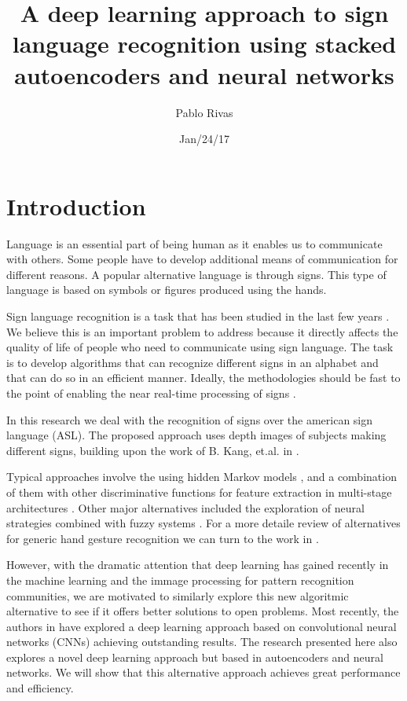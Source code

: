 \title{A deep learning approach to sign language recognition using stacked 
autoencoders and neural networks}
\author{Pablo Rivas}
\date{Jan/24/17}


\lstset{language=Python}

\maketitle

\section{Introduction}

Language is an essential part of being human as it enables us to communicate
with others. Some people have to develop additional means of communication
for different reasons. A popular alternative language is through signs. This
type of language is based on symbols or figures produced using the hands. 

Sign language recognition is a task that has been studied in the last few years
\cite{starner1998real}. We believe this is an important problem to address
because it directly affects the quality of life of people who need to
communicate using sign language. The task is to develop algorithms that can
recognize different signs in an alphabet and that can do so in an efficient
manner. Ideally, the methodologies should be fast to the point of enabling the 
near real-time processing of signs \cite{starner1997real}.

In this research we deal with the recognition of signs over the american sign
language (ASL). The proposed approach uses depth images of subjects making
different signs, building upon the work of B. Kang, et.al. in
\cite{kang2015real}. 

Typical approaches involve the using hidden Markov models
\cite{starner1997real}, and a combination of them with other discriminative
functions for feature extraction in multi-stage architectures
\cite{lichtenauer2008sign}. Other major alternatives included the exploration
of neural strategies combined with fuzzy systems \cite{al2001recognition}. For
a more detaile review of alternatives for generic hand gesture recognition we
can turn to the work in \cite{murthy2009review}.

However, with the dramatic attention that deep learning has gained recently 
in the machine learning and the immage processing for pattern recognition
communities, we are motivated to similarly explore this new algoritmic
alternative to see if it offers better solutions to open problems. Most
recently, the authors in \cite{kang2015real} have explored a deep learning
approach based on convolutional neural networks (CNNs) achieving outstanding
results. The research presented here also explores a novel deep learning
approach but based in autoencoders and neural networks. We will show that this
alternative approach achieves great performance and efficiency.

